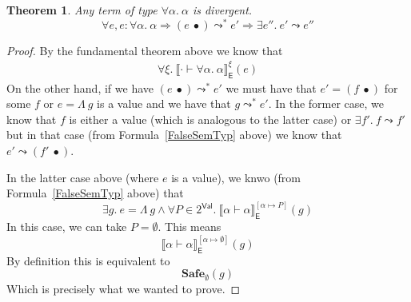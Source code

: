 \documentclass{article}
\newtheorem{theorem}{Theorem}
\newcommand{\EXP}{\mathsf{E}}
\newcommand{\VAL}{\mathsf{Val}}
\newcommand{\semtyp}[2]{\llbracket #2 \rrbracket_{#1}}
\begin{document}
\begin{theorem}
Any term of type $\forall \alpha.~\alpha$ is divergent.
\[
\forall e, e : \forall \alpha.~\alpha \Rightarrow
(e~\bullet) \leadsto^* e' \Rightarrow \exists e''.~e' \leadsto e''
\]
\end{theorem}

\begin{proof}
By the fundamental theorem above we know that
\begin{align}
\forall \xi.~ \semtyp{\EXP}{\cdot \vdash \forall \alpha.~\alpha}^{\xi}(e)
\label{FalseSemTyp}
\end{align}
On the other hand, if we have $(e~\bullet) \leadsto^* e'$ we must have
that $e' = (f~\bullet)$ for some $f$ or $e = \Lambda~g$ is a value and
we have that $g \leadsto^* e'$.
In the former case, we know that $f$ is either a value (which is analogous to the latter case) or $\exists f'.~f \leadsto f'$ but in that
case (from Formula~\ref{FalseSemTyp} above) we know that
$e' \leadsto (f'~\bullet)$.

In the latter case above (where $e$ is a value), we knwo
(from Formula~\ref{FalseSemTyp} above) that
\[
\exists g.~e = \Lambda~g \land
\forall P\in 2^{\VAL}.~\semtyp{\EXP}{\alpha \vdash \alpha}^{[\alpha \mapsto P]}(g)
\]
In this case, we can take $P = \emptyset$. This means
\[
\semtyp{\EXP}{\alpha \vdash \alpha}^{[\alpha \mapsto \emptyset]}(g)
\]
By definition this is equivalent to
\[
\mathbf{Safe}_{\emptyset}(g)
\]
Which is precisely what we wanted to prove.
\end{proof}
\end{document}
